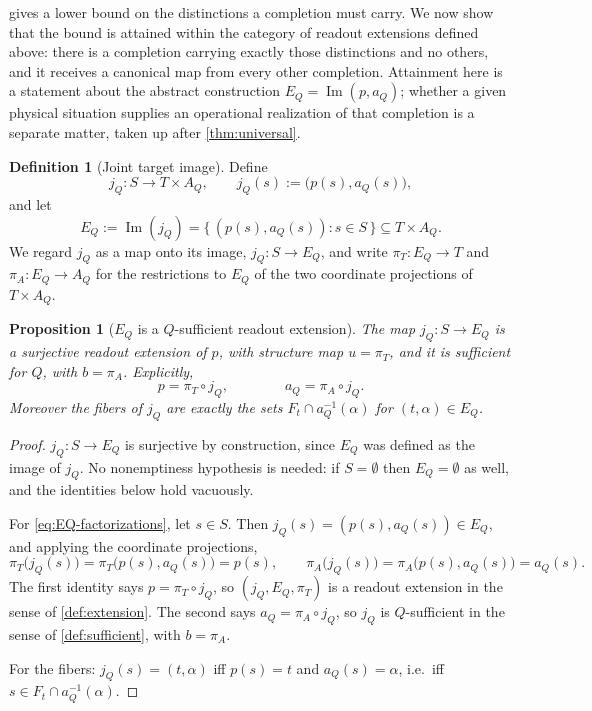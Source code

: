 \documentclass[11pt,reqno]{amsart}
\theoremstyle{plain}
\newtheorem{proposition}[theorem]{Proposition}
\theoremstyle{definition}
\newtheorem{definition}[theorem]{Definition}
\newcommand{\Src}{S}
\newcommand{\Rdt}{T}
\newcommand{\Img}{\operatorname{Im}}
\begin{document}
 gives a lower bound on the distinctions a completion must carry. We now
show that the bound is attained within the category of readout extensions defined above: there
is a completion carrying exactly those distinctions and no others, and it receives a canonical
map from every other completion. Attainment here is a statement about the abstract construction
$E_Q=\Img(p,a_Q)$; whether a given physical situation supplies an operational realization of that
completion is a separate matter, taken up after \cref{thm:universal}.

\begin{definition}[Joint target image]\label{def:joint}
Define
\begin{equation}\label{eq:jQ}
j_Q\colon\Src\longrightarrow\Rdt\times A_Q,
\qquad
j_Q(s):=\bigl(p(s),a_Q(s)\bigr),
\end{equation}
and let
\begin{equation}\label{eq:EQ}
E_Q:=\Img(j_Q)=\bigl\{\,(p(s),a_Q(s)) : s\in\Src \,\bigr\}\subseteq\Rdt\times A_Q .
\end{equation}
We regard $j_Q$ as a map onto its image, $j_Q\colon\Src\to E_Q$, and write
$\pi_\Rdt\colon E_Q\to\Rdt$ and $\pi_A\colon E_Q\to A_Q$ for the restrictions to $E_Q$ of the two
coordinate projections of $\Rdt\times A_Q$.
\end{definition}

\begin{proposition}[$E_Q$ is a $Q$-sufficient readout extension]\label{prop:EQ-sufficient}
The map $j_Q\colon\Src\to E_Q$ is a surjective readout extension of $p$, with structure map
$u=\pi_\Rdt$, and it is sufficient for $Q$, with $b=\pi_A$. Explicitly,
\begin{equation}\label{eq:EQ-factorizations}
p=\pi_\Rdt\circ j_Q,
\qquad\qquad
a_Q=\pi_A\circ j_Q .
\end{equation}
Moreover the fibers of $j_Q$ are exactly the sets $F_t\cap a_Q^{-1}(\alpha)$ for
$(t,\alpha)\in E_Q$.
\end{proposition}

\begin{proof}
$j_Q\colon\Src\to E_Q$ is surjective by construction, since $E_Q$ was defined as the image of
$j_Q$. No nonemptiness hypothesis is needed: if $\Src=\emptyset$ then $E_Q=\emptyset$ as well, and
the identities below hold vacuously.

For \eqref{eq:EQ-factorizations}, let $s\in\Src$. Then $j_Q(s)=(p(s),a_Q(s))\in E_Q$, and
applying the coordinate projections,
\begin{equation*}
\pi_\Rdt\bigl(j_Q(s)\bigr)=\pi_\Rdt\bigl(p(s),a_Q(s)\bigr)=p(s),
\qquad
\pi_A\bigl(j_Q(s)\bigr)=\pi_A\bigl(p(s),a_Q(s)\bigr)=a_Q(s).
\end{equation*}
The first identity says $p=\pi_\Rdt\circ j_Q$, so $(j_Q,E_Q,\pi_\Rdt)$ is a readout extension in
the sense of \cref{def:extension}. The second says $a_Q=\pi_A\circ j_Q$, so $j_Q$ is
$Q$-sufficient in the sense of \cref{def:sufficient}, with $b=\pi_A$.

For the fibers: $j_Q(s)=(t,\alpha)$ iff $p(s)=t$ and $a_Q(s)=\alpha$, i.e.\ iff
$s\in F_t\cap a_Q^{-1}(\alpha)$.
\end{proof}
\end{document}
